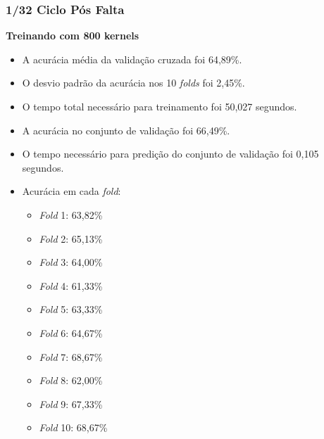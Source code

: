 \subsubsection{1/32 Ciclo Pós Falta}
\textbf{Treinando com 800 kernels}
\begin{itemize}
    \item A acurácia média da validação cruzada foi 64,89\%.
    \item O desvio padrão da acurácia nos 10 \textit{folds} foi 2,45\%.
    \item O tempo total necessário para treinamento foi 50,027 segundos.
    \item A acurácia no conjunto de validação foi 66,49\%.
    \item O tempo necessário para predição do conjunto de validação foi 0,105 segundos.
    \item Acurácia em cada \textit{fold}:
    \begin{itemize}
        \item \textit{Fold} 1: 63,82\%
        \item \textit{Fold} 2: 65,13\%
        \item \textit{Fold} 3: 64,00\%
        \item \textit{Fold} 4: 61,33\%
        \item \textit{Fold} 5: 63,33\%
        \item \textit{Fold} 6: 64,67\%
        \item \textit{Fold} 7: 68,67\%
        \item \textit{Fold} 8: 62,00\%
        \item \textit{Fold} 9: 67,33\%
        \item \textit{Fold} 10: 68,67\%
    \end{itemize}
\end{itemize}

